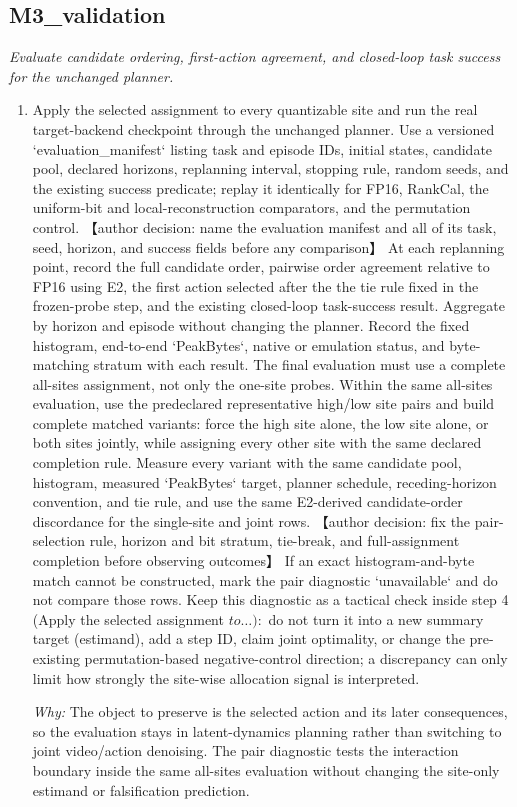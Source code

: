 \documentclass[10pt,a4paper]{article}
\begin{document}
\subsection*{M3\_validation}
\emph{Evaluate candidate ordering, first-action agreement, and closed-loop task success for the unchanged planner.}
\begin{enumerate}[leftmargin=*,start=4]
  \item Apply the selected assignment to every quantizable site and run the real target-backend checkpoint through the unchanged planner. Use a versioned `evaluation\_manifest` listing task and episode IDs, initial states, candidate pool, declared horizons, replanning interval, stopping rule, random seeds, and the existing success predicate;\allowbreak{} replay it identically for FP16, RankCal, the uniform-bit and local-reconstruction comparators, and the permutation control. 【author decision: name the evaluation manifest and all of its task, seed, horizon, and success fields before any comparison】 At each replanning point, record the full candidate order, pairwise order agreement relative to FP16 using E2, the first action selected after the the tie rule fixed in the frozen-probe step, and the existing closed-loop task-success result. Aggregate by horizon and episode without changing the planner. Record the fixed histogram, end-to-end `PeakBytes`, native or emulation status, and byte-matching stratum with each result. The final evaluation must use a complete all-sites assignment, not only the one-site probes. Within the same all-sites evaluation, use the predeclared representative high/low site pairs and build complete matched variants: force the high site alone, the low site alone, or both sites jointly, while assigning every other site with the same declared completion rule. Measure every variant with the same candidate pool, histogram, measured `PeakBytes` target, planner schedule, receding-horizon convention, and tie rule, and use the same E2-derived candidate-order discordance for the single-site and joint rows. 【author decision: fix the pair-selection rule, horizon and bit stratum, tie-break, and full-assignment completion before observing outcomes】 If an exact histogram-and-byte match cannot be constructed, mark the pair diagnostic `unavailable` and do not compare those rows. Keep this diagnostic as a tactical check inside step 4 (Apply the selected assignment \(to\dots ):\) do not turn it into a new summary target (estimand), add a step ID, claim joint optimality, or change the pre-existing permutation-based negative-control direction;\allowbreak{} a discrepancy can only limit how strongly the site-wise allocation signal is interpreted.
\par\emph{Why:} The object to preserve is the selected action and its later consequences, so the evaluation stays in latent-dynamics planning rather than switching to joint video/action denoising. The pair diagnostic tests the interaction boundary inside the same all-sites evaluation without changing the site-only estimand or falsification prediction.
\end{enumerate}
\end{document}
